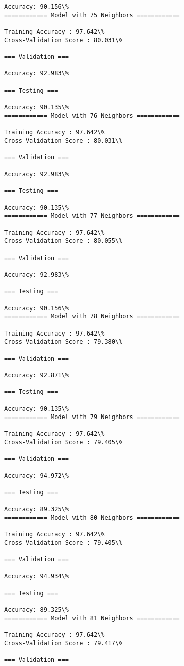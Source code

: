 \documentclass[11pt]{article}
\begin{document}
\begin{Verbatim}[commandchars=\\\{\}]
Accuracy: 90.156\%
============ Model with 75 Neighbors ============

Training Accuracy : 97.642\%
Cross-Validation Score : 80.031\%

=== Validation ===

Accuracy: 92.983\%

=== Testing ===

Accuracy: 90.135\%
============ Model with 76 Neighbors ============

Training Accuracy : 97.642\%
Cross-Validation Score : 80.031\%

=== Validation ===

Accuracy: 92.983\%

=== Testing ===

Accuracy: 90.135\%
============ Model with 77 Neighbors ============

Training Accuracy : 97.642\%
Cross-Validation Score : 80.055\%

=== Validation ===

Accuracy: 92.983\%

=== Testing ===

Accuracy: 90.156\%
============ Model with 78 Neighbors ============

Training Accuracy : 97.642\%
Cross-Validation Score : 79.380\%

=== Validation ===

Accuracy: 92.871\%

=== Testing ===

Accuracy: 90.135\%
============ Model with 79 Neighbors ============

Training Accuracy : 97.642\%
Cross-Validation Score : 79.405\%

=== Validation ===

Accuracy: 94.972\%

=== Testing ===

Accuracy: 89.325\%
============ Model with 80 Neighbors ============

Training Accuracy : 97.642\%
Cross-Validation Score : 79.405\%

=== Validation ===

Accuracy: 94.934\%

=== Testing ===

Accuracy: 89.325\%
============ Model with 81 Neighbors ============

Training Accuracy : 97.642\%
Cross-Validation Score : 79.417\%

=== Validation ===


\end{Verbatim}
\end{document}
